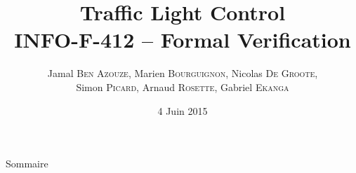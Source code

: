 \documentclass{bredelebeamer}
\begin{document}
\title[INFO-F-412 - Traffic Light Control]{\textbf{Traffic Light Control} \\INFO-F-412 -- Formal Verification} %

\author[]{Jamal \textsc{Ben Azouze}, Marien \textsc{Bourguignon}, Nicolas \textsc{De Groote}, \\Simon \textsc{Picard}, Arnaud \textsc{Rosette}, Gabriel \textsc{Ekanga}}
\date{4 Juin 2015} %

\begin{frame}
\titlepage %
\end{frame}

\begin{frame}{Sommaire}
\tableofcontents %
\end{frame}
\end{document}
